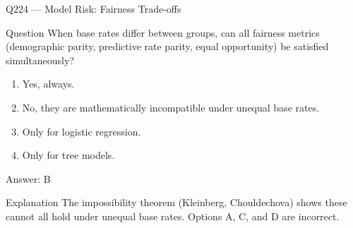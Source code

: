 \documentclass[aspectratio=169,8pt]{beamer}
\begin{document}
																															\begin{frame}{Q224 --- Model Risk: Fairness Trade-offs}
																																\begin{block}{Question}
																																	When base rates differ between groups, can all fairness metrics (demographic parity, predictive rate parity, equal opportunity) be satisfied simultaneously?
																																	\begin{enumerate}
																																		\item Yes, always.
																																		\item No, they are mathematically incompatible under unequal base rates.
																																		\item Only for logistic regression.
																																		\item Only for tree models.
																																	\end{enumerate}  \end{block}
																																	\begin{exampleblock}{Answer: B}\end{exampleblock}
																																	\begin{block}{Explanation}
																																		The impossibility theorem (Kleinberg, Chouldechova) shows these cannot all hold under unequal base rates. Options A, C, and D are incorrect.
																																	\end{block}
																																\end{frame}
																																
\end{document}
